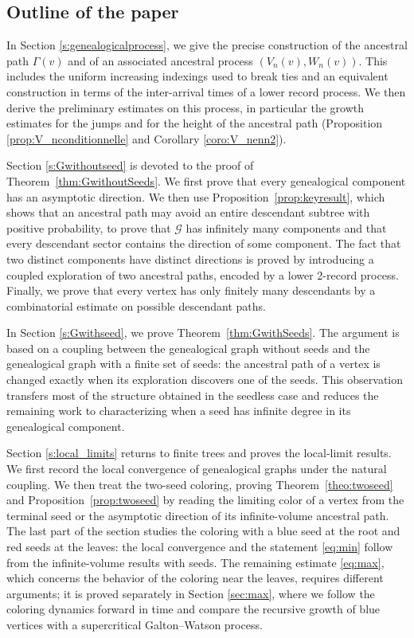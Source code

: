 \documentclass[french]{article}
\renewcommand{\1}{\mathds{1}}
\begin{document}
\subsection*{Outline of the paper}

In Section \ref{s:genealogicalprocess}, we give the precise construction of the ancestral path $\Gamma(v)$ and of an associated ancestral process $(V_n(v),W_n(v))$. This includes the uniform increasing indexings used to break ties and an equivalent construction in terms of the inter-arrival times of a lower record process. We then derive the preliminary estimates on this process, in particular the growth estimates for the jumps and for the height of the ancestral path (Proposition \ref{prop:V_nconditionnelle} and Corollary \ref{coro:V_nenn2}).

\medskip

Section \ref{s:Gwithoutseed} is devoted to the proof of Theorem~\ref{thm:GwithoutSeeds}. We first prove that every genealogical component has an asymptotic direction. We then use Proposition~\ref{prop:keyresult}, which shows that an ancestral path may avoid an entire descendant subtree with positive probability, to prove that $\mathcal{G}$ has infinitely many components and that every descendant sector contains the direction of some component. The fact that two distinct components have distinct directions is proved by introducing a coupled exploration of two ancestral paths, encoded by a lower 2-record process. Finally, we prove that every vertex has only finitely many descendants by a combinatorial estimate on possible descendant paths.


\medskip 

In Section \ref{s:Gwithseed}, we prove Theorem~\ref{thm:GwithSeeds}. The argument is based on a coupling between the genealogical graph without seeds and the genealogical graph with a finite set of seeds: the ancestral path of a vertex is changed exactly when its exploration discovers one of the seeds. This observation transfers most of the structure obtained in the seedless case and reduces the remaining work to characterizing when a seed has infinite degree in its genealogical component.


\medskip 

Section \ref{s:local_limits} returns to finite trees and proves the local-limit results. We first record the local convergence of genealogical graphs under the natural coupling. We then treat the two-seed coloring, proving Theorem~\ref{theo:twoseed} and Proposition~\ref{prop:twoseed} by reading the limiting color of a vertex from the terminal seed or the asymptotic direction of its infinite-volume ancestral path. The last part of the section studies the coloring with a blue seed at the root and red seeds at the leaves: the local convergence and the statement \eqref{eq:min} follow from the infinite-volume results with seeds. The remaining estimate \eqref{eq:max}, which concerns the behavior of the coloring near the leaves, requires different arguments; it is proved separately in Section \ref{sec:max}, where we follow the coloring dynamics forward in time and compare the recursive growth of blue vertices with a supercritical Galton--Watson process.
\end{document}
